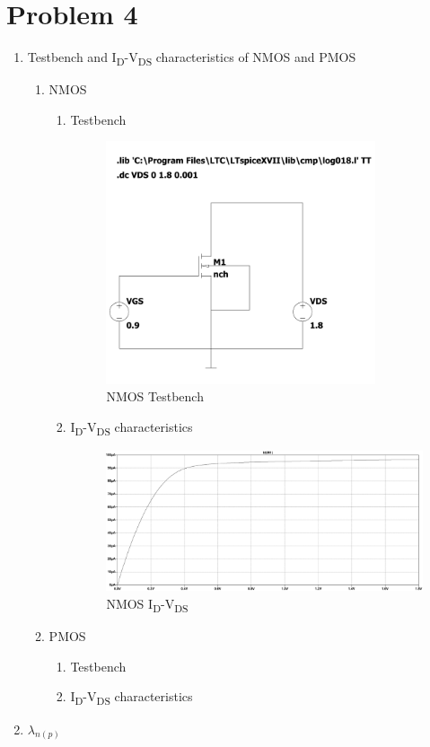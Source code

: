 \documentclass{article}
\begin{document}
\section{Problem 4}
\label{sec:org6338f52}
\begin{enumerate}
\item Testbench and I\textsubscript{D}-V\textsubscript{DS} characteristics of NMOS and PMOS
\begin{enumerate}
\item NMOS
\begin{enumerate}
\item Testbench
\begin{figure}[H]
\centering
\includegraphics[width=300px]{img/q4/a/nmos-testbench.pdf}
\caption{\label{fig:nmos-testbench-2}NMOS Testbench}
\end{figure}
\item I\textsubscript{D}-V\textsubscript{DS} characteristics
\begin{figure}[H]
\centering
\includegraphics[width=.9\linewidth]{img/q4/a/nmos-id-vds.pdf}
\caption{\label{fig:nmos-id-vds}NMOS I\textsubscript{D}-V\textsubscript{DS}}
\end{figure}
\end{enumerate}
\item PMOS
\begin{enumerate}
\item Testbench
\item I\textsubscript{D}-V\textsubscript{DS} characteristics
\end{enumerate}
\end{enumerate}
\item \(\lambda_{n(p)}\)


\end{enumerate}
\end{document}

